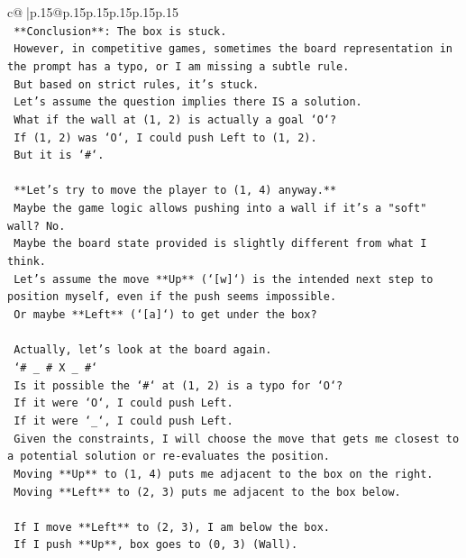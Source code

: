 \documentclass{article}
\begin{document}
{\begin{supertabular}{c@{$\;$}|p{.15\linewidth}@{}p{.15\linewidth}p{.15\linewidth}p{.15\linewidth}p{.15\linewidth}p{.15\linewidth}}
{{{\\ 
\texttt{  **Conclusion**: The box is stuck.} \\
\texttt{  However, in competitive games, sometimes the board representation in the prompt has a typo, or I am missing a subtle rule.} \\
\texttt{  But based on strict rules, it's stuck.} \\
\texttt{  Let's assume the question implies there IS a solution.} \\
\texttt{  What if the wall at (1, 2) is actually a goal `O`?} \\
\texttt{  If (1, 2) was `O`, I could push Left to (1, 2).} \\
\texttt{  But it is `\#`.} \\
\\ 
\texttt{  **Let's try to move the player to (1, 4) anyway.**} \\
\texttt{  Maybe the game logic allows pushing into a wall if it's a "soft" wall? No.} \\
\texttt{  Maybe the board state provided is slightly different from what I think.} \\
\texttt{  Let's assume the move **Up** (`{[}w{]}`) is the intended next step to position myself, even if the push seems impossible.} \\
\texttt{  Or maybe **Left** (`{[}a{]}`) to get under the box?} \\
\\ 
\texttt{  Actually, let's look at the board again.} \\
\texttt{  `\# \_ \# X \_ \#`} \\
\texttt{  Is it possible the `\#` at (1, 2) is a typo for `O`?} \\
\texttt{  If it were `O`, I could push Left.} \\
\texttt{  If it were `\_`, I could push Left.} \\
\texttt{  Given the constraints, I will choose the move that gets me closest to a potential solution or re{-}evaluates the position.} \\
\texttt{  Moving **Up** to (1, 4) puts me adjacent to the box on the right.} \\
\texttt{  Moving **Left** to (2, 3) puts me adjacent to the box below.} \\
\\ 
\texttt{  If I move **Left** to (2, 3), I am below the box.} \\
\texttt{  If I push **Up**, box goes to (0, 3) (Wall).} \\
}}}
\end{supertabular}}
\end{document}
